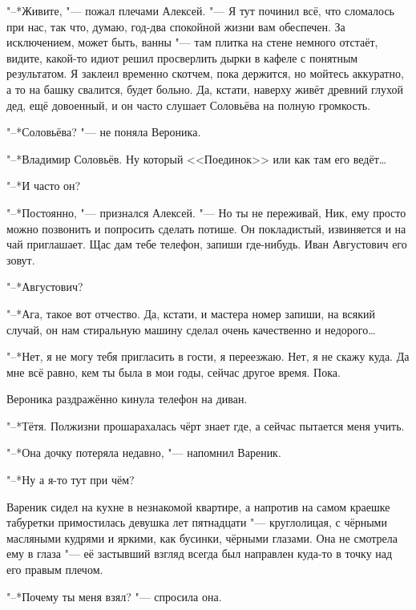 "--*Живите, "--- пожал плечами Алексей.
"--- Я тут починил всё, что сломалось при нас, так что, думаю, год-два спокойной жизни вам обеспечен.
За исключением, может быть, ванны "--- там плитка на стене немного отстаёт, видите, какой-то идиот решил просверлить дырки в кафеле с понятным результатом.
Я заклеил временно скотчем, пока держится, но мойтесь аккуратно, а то на башку свалится, будет больно.
Да, кстати, наверху живёт древний глухой дед, ещё довоенный, и он часто слушает Соловьёва на полную громкость.

"--*Соловьёва? "--- не поняла Вероника.

"--*Владимир Соловьёв.
Ну который <<Поединок>> или как там его ведёт\ldots{}

"--*И часто он?

"--*Постоянно, "--- признался Алексей.
"--- Но ты не переживай, Ник, ему просто можно позвонить и попросить сделать потише.
Он покладистый, извиняется и на чай приглашает.
Щас дам тебе телефон, запиши где-нибудь.
Иван Августович его зовут.

"--*Августович?

"--*Ага, такое вот отчество.
Да, кстати, и мастера номер запиши, на всякий случай, он нам стиральную машину сделал очень качественно и недорого\ldots{}

\asterism

\textspace

"--*Нет, я не могу тебя пригласить в гости, я переезжаю.
Нет, я не скажу куда.
Да мне всё равно, кем ты была в мои годы, сейчас другое время.
Пока.

Вероника раздражённо кинула телефон на диван.

"--*Тётя.
Полжизни прошарахалась чёрт знает где, а сейчас пытается меня учить.

"--*Она дочку потеряла недавно, "--- напомнил Вареник.

"--*Ну а я-то тут при чём?

\textspace

\asterism

\textspace

\label{Sat_2012_06_09}

Вареник сидел на кухне в незнакомой квартире, а напротив на самом краешке табуретки примостилась девушка лет пятнадцати "--- круглолицая, с чёрными масляными кудрями и яркими, как бусинки, чёрными глазами.
Она не смотрела ему в глаза "--- её застывший взгляд всегда был направлен куда-то в точку над его правым плечом.

"--*Почему ты меня взял? "--- спросила она.


